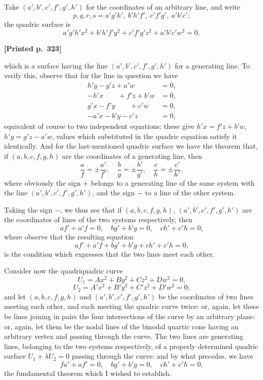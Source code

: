 \documentclass[11pt]{article}
\begin{document}
\medskip

Take $(a', b', c', f', g', h')$ for the coordinates of an arbitrary line, and write
\[
p, q, r, s = a'g'h',\ b'h'f',\ c'f'g',\ a'b'c';
\]
the quadric surface is
\[
a'g'h'x^{2} + b'h'f'y^{2} + c'f'g'z^{2} + a'b'c'w^{2} = 0,
\]

\medskip

\noindent\textbf{[Printed p.~323]}\hfill

which is a surface having the line $(a', b', c', f', g', h')$ for a generating line. To verify this, observe that for the line in question we have
\begin{align*}
h'y - g'z + a'w &= 0, \\
-h'x \phantom{- g'z} + f'z + b'w &= 0, \\
g'x - f'y \phantom{+ g'z} + c'w &= 0, \\
-a'x - b'y - c'z \phantom{+ d'w} &= 0,
\end{align*}
equivalent of course to two independent equations: these give $h'x = f'z + b'w$, $h'y = g'z - a'w$, values which substituted in the quadric equation satisfy it identically. And for the last-mentioned quadric surface we have the theorem that, if $(a, b, c, f, g, h)$ are the coordinates of a generating line, then
\[
\frac{a}{f} = \pm\frac{a'}{f'},\quad \frac{b}{g} = \pm\frac{b'}{g'},\quad \frac{c}{h} = \pm\frac{c'}{h'},
\]
where obviously the sign $+$ belongs to a generating line of the same system with the line $(a', b', c', f', g', h')$, and the sign $-$ to a line of the other system.

\medskip

Taking the sign $-$, we thus see that if $(a, b, c, f, g, h)$, $(a', b', c', f', g', h')$ are the coordinates of lines of the two systems respectively, then
\[
af' + a'f = 0,\quad bg' + b'g = 0,\quad ch' + c'h = 0;
\]
where observe that the resulting equation
\[
af' + a'f + bg' + b'g + ch' + c'h = 0,
\]
is the condition which expresses that the two lines meet each other.

\medskip

Consider now the quadriquadric curve
\[
U_{1} = A x^{2} + B y^{2} + C z^{2} + D w^{2} = 0,
\]
\[
U_{2} = A'x^{2} + B'y^{2} + C'z^{2} + D'w^{2} = 0;
\]
and let $(a, b, c, f, g, h)$ and $(a', b', c', f', g', h')$ be the coordinates of two lines meeting each other, and each meeting the quadric curve twice: or, again, let these be lines joining in pairs the four intersections of the curve by an arbitrary plane: or, again, let them be the nodal lines of the binodal quartic cone having an arbitrary vertex and passing through the curve. The two lines are generating lines, belonging to the two systems respectively, of a properly determined quadric surface $U_{1} + \lambda U_{2} = 0$ passing through the curve: and by what precedes, we have
\[
fa' + af' = 0,\quad bg' + b'g = 0,\quad ch' + c'h = 0,
\]
the fundamental theorem which I wished to establish.
\end{document}
